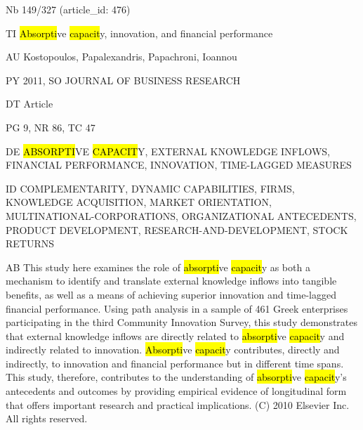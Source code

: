 \documentclass[a4paper]{article}
\begin{document}
\vspace*{-2cm}
Nb \tabto{0cm}149/327 (article\_id: 476)\par
TI \tabto{0cm}\hl{Absorpti}ve \hl{capacit}y, innovation, and financial performance\par
AU \tabto{0cm}Kostopoulos, Papalexandris, Papachroni, Ioannou\par
PY \tabto{0cm}2011, SO JOURNAL OF BUSINESS RESEARCH\par
DT \tabto{0cm}Article\par
PG \tabto{0cm}9, NR 86, TC 47\par
DE \tabto{0cm}\hl{ABSORPTI}VE \hl{CAPACIT}Y, EXTERNAL KNOWLEDGE INFLOWS, FINANCIAL PERFORMANCE, INNOVATION, TIME-LAGGED MEASURES\par
ID \tabto{0cm}COMPLEMENTARITY, DYNAMIC CAPABILITIES, FIRMS, KNOWLEDGE ACQUISITION, MARKET ORIENTATION, MULTINATIONAL-CORPORATIONS, ORGANIZATIONAL ANTECEDENTS, PRODUCT DEVELOPMENT, RESEARCH-AND-DEVELOPMENT, STOCK RETURNS\par
AB \tabto{0cm}This study here examines the role of \hl{absorpti}ve \hl{capacit}y as both a mechanism to identify and translate external knowledge inflows into tangible benefits, as well as a means of achieving superior innovation and time-lagged financial performance. Using path analysis in a sample of 461 Greek enterprises participating in the third Community Innovation Survey, this study demonstrates that external knowledge inflows are directly related to \hl{absorpti}ve \hl{capacit}y and indirectly related to innovation. \hl{Absorpti}ve \hl{capacit}y contributes, directly and indirectly, to innovation and financial performance but in different time spans. This study, therefore, contributes to the understanding of \hl{absorpti}ve \hl{capacit}y's antecedents and outcomes by providing empirical evidence of longitudinal form that offers important research and practical implications. (C) 2010 Elsevier Inc. All rights reserved.\par
\clearpage
\end{document}
